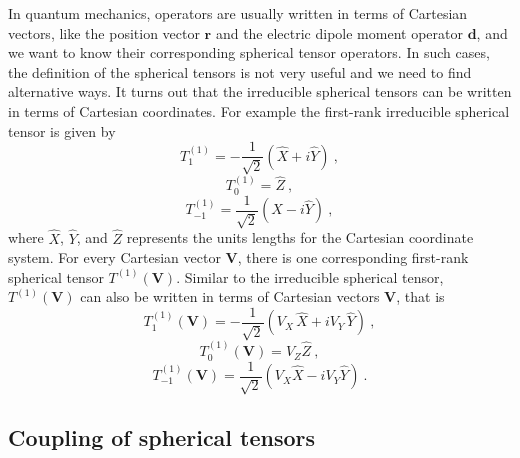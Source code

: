 In quantum mechanics, operators are usually written in terms of Cartesian vectors, like the position vector 
$\mathbf{r}$ and the electric dipole moment operator $\mathbf{d}$, and we want to know their corresponding spherical 
tensor operators. In such cases, the definition of the spherical tensors is 
not very useful and we need to find alternative ways. It turns out that the irreducible spherical tensors can be written in 
terms of Cartesian 
 coordinates. For example the first-rank irreducible spherical tensor is given by
\begin{equation}
T^{(1)}_{1} = - \frac{1}{\sqrt{2}} (\hat{X} + i \hat{Y}) \ , 
\end{equation}
\begin{equation}
T^{(1)}_{0}  = \hat{Z} \ ,
\end{equation}
\begin{equation}
T^{(1)}_{-1} =  \frac{1}{\sqrt{2}} (\hat{X} - i \hat{Y}) \ ,  
\end{equation}
where $\hat{X}$, $\hat{Y}$, and $\hat{Z}$ represents the units lengths for the Cartesian coordinate system.
For every Cartesian vector $\mathbf{V}$, there is one corresponding first-rank spherical tensor $T^{(1)}(\mathbf{V})$.  
Similar to the irreducible spherical tensor,  $T^{(1)}(\mathbf{V})$ can also be written in terms of Cartesian vectors 
$\mathbf{V}$, that is
\begin{equation}
T^{(1)}_{1}(\mathbf{V}) = - \frac{1}{\sqrt{2}} (V_{X}\,\hat{X} + i V_{Y}\,\hat{Y}) \ , \label{t11}
\end{equation}
\begin{equation}
T^{(1)}_{0}(\mathbf{V})  = V_{Z}\hat{Z} \ , \label{t10}
\end{equation}
\begin{equation}
T^{(1)}_{-1}(\mathbf{V}) =  \frac{1}{\sqrt{2}} (V_{X}\hat{X} - i V_{Y}\hat{Y}) \ .  \label{t1-1}
\end{equation}


\subsection{Coupling of spherical tensors}

